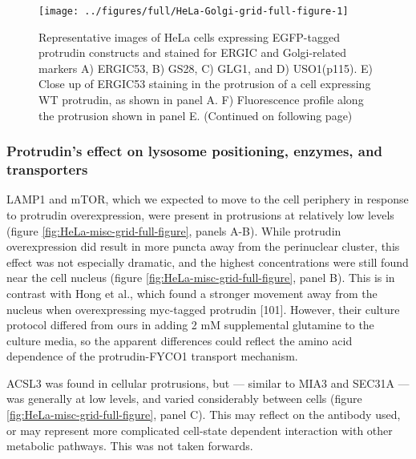 \documentclass[
  12pt,
  a4paper,
]{book}
\begin{document}
\begin{figure}
\texttt{[image: ../figures/full/HeLa-Golgi-grid-full-figure-1]} \caption[Protrudin-expressing HeLa cells stained for ERGIC53, GS28, GLG1, and USO1]{Representative images of HeLa cells expressing EGFP-tagged protrudin constructs and stained for ERGIC and Golgi-related markers A) ERGIC53, B) GS28, C) GLG1, and D) USO1(p115). E) Close up of ERGIC53 staining in the protrusion of a cell expressing WT protrudin, as shown in panel A. F) Fluorescence profile along the protrusion shown in panel E. (Continued on following page)}\label{fig:HeLa-Golgi-grid-full-figure}
\end{figure}

\begin{figure}[h]
\end{figure}

\hypertarget{protrudins-effect-on-lysosome-positioning-enzymes-and-transporters}{%
\subsubsection{Protrudin's effect on lysosome positioning, enzymes, and transporters}\label{protrudins-effect-on-lysosome-positioning-enzymes-and-transporters}}

LAMP1 and mTOR, which we expected to move to the cell periphery in response to protrudin overexpression, were present in protrusions at relatively low levels (figure \ref{fig:HeLa-misc-grid-full-figure}, panels A-B). While protrudin overexpression did result in more puncta away from the perinuclear cluster, this effect was not especially dramatic, and the highest concentrations were still found near the cell nucleus (figure \ref{fig:HeLa-misc-grid-full-figure}, panel B). This is in contrast with Hong et al., which found a stronger movement away from the nucleus when overexpressing myc-tagged protrudin {[}101{]}. However, their culture protocol differed from ours in adding 2 mM supplemental glutamine to the culture media, so the apparent differences could reflect the amino acid dependence of the protrudin-FYCO1 transport mechanism.

ACSL3 was found in cellular protrusions, but --- similar to MIA3 and SEC31A --- was generally at low levels, and varied considerably between cells (figure \ref{fig:HeLa-misc-grid-full-figure}, panel C). This may reflect on the antibody used, or may represent more complicated cell-state dependent interaction with other metabolic pathways. This was not taken forwards.
\end{document}
